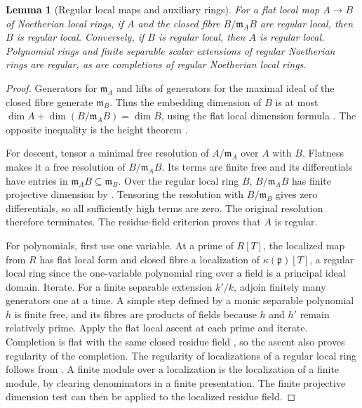 \documentclass[11pt,oneside,openany]{book}
\newtheorem{lemma}[theorem]{Lemma}
\theoremstyle{definition}
\theoremstyle{remark}
\begin{document}
\begin{lemma}[Regular local maps and auxiliary rings]\label{res:X02}
For a flat local map \(A\to B\) of Noetherian local rings, if \(A\) and the closed fibre \(B/\mathfrak m_A B\) are regular local, then \(B\) is regular local. Conversely, if \(B\) is regular local, then \(A\) is regular local. Polynomial rings and finite separable scalar extensions of regular Noetherian rings are regular, as are completions of regular Noetherian local rings.
\end{lemma}
\begin{proof}
Generators for \(\mathfrak m_A\) and lifts of generators for the maximal ideal of the closed fibre generate \(\mathfrak m_B\). Thus the embedding dimension of \(B\) is at most \(\dim A+\dim(B/\mathfrak m_A B)=\dim B\), using the flat local dimension formula \cite[CM-10]{core}. The opposite inequality is the height theorem \cite[ALG-05-C03-R01]{p103}.

For descent, tensor a minimal free resolution of \(A/\mathfrak m_A\) over \(A\) with \(B\). Flatness makes it a free resolution of \(B/\mathfrak m_A B\). Its terms are finite free and its differentials have entries in \(\mathfrak m_A B\subseteq\mathfrak m_B\). Over the regular local ring \(B\), \(B/\mathfrak m_A B\) has finite projective dimension by \cite[CM-12]{core}. Tensoring the resolution with \(B/\mathfrak m_B\) gives zero differentials, so all sufficiently high terms are zero. The original resolution therefore terminates. The residue-field criterion \cite[CM-19]{core} proves that \(A\) is regular.

For polynomials, first use one variable. At a prime of \(R[T]\), the localized map from \(R\) has flat local form and closed fibre a localization of \(\kappa(\mathfrak p)[T]\), a regular local ring since the one-variable polynomial ring over a field is a principal ideal domain. Iterate. For a finite separable extension \(k'/k\), adjoin finitely many generators one at a time. A simple step defined by a monic separable polynomial \(h\) is finite free, and its fibres are products of fields because \(h\) and \(h'\) remain relatively prime. Apply the flat local ascent at each prime and iterate. Completion is flat with the same closed residue field \cite[ALG-05-C04-S01]{p103}, so the ascent also proves regularity of the completion. The regularity of localizations of a regular local ring follows from \cite[CM-12, CM-19]{core}. A finite module over a localization is the localization of a finite module, by clearing denominators in a finite presentation. The finite projective dimension test can then be applied to the localized residue field.
\end{proof}
\end{document}
